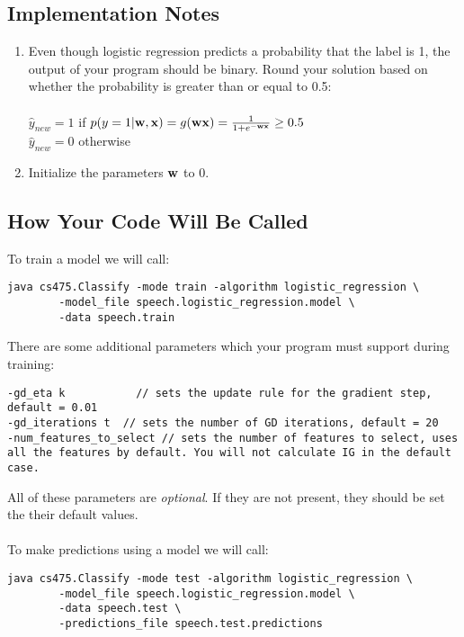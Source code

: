 \documentclass[11pt]{article}
\newcommand{\vw}{{\bf w}}
\newcommand{\vx}{{\bf x}}
\begin{document}
\subsection{Implementation Notes}
\begin{enumerate}[1.]
\item
Even though logistic regression predicts a probability that the label is 1, the output of your program should be binary. Round your solution based on whether the probability is greater than or equal to 0.5:\\
\\
$\hat{y}_{new} = 1$ if $p(y = 1 | \vw, \vx) = g(\vw \vx) = \frac{1}{1 + e^{-\vw \vx}} \ge 0.5$\\
$\hat{y}_{new} = 0$ otherwise\\

\item
Initialize the parameters $\vw$ to $0$.

\end{enumerate}


\subsection{How Your Code Will Be Called}

To train a model we will call:
\begin{verbatim}
java cs475.Classify -mode train -algorithm logistic_regression \
        -model_file speech.logistic_regression.model \
        -data speech.train
\end{verbatim}

There are some additional parameters which your program must support during training:
\begin{verbatim}
-gd_eta k	        // sets the update rule for the gradient step, default = 0.01
-gd_iterations t  // sets the number of GD iterations, default = 20
-num_features_to_select // sets the number of features to select, uses 
all the features by default. You will not calculate IG in the default case.
\end{verbatim}

All of these parameters are \emph{optional}. If they are not present, they should be set the their default values.\\
\\
To make predictions using a model we will call:
\begin{verbatim}
java cs475.Classify -mode test -algorithm logistic_regression \
        -model_file speech.logistic_regression.model \
        -data speech.test \
        -predictions_file speech.test.predictions
\end{verbatim}
\end{document}
